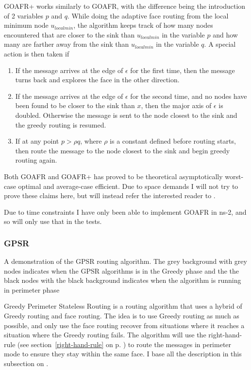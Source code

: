 GOAFR+ works similarly to GOAFR, with the difference being the introduction of 2 variables $p$ and $q$. While doing the adaptive face routing from the local minimum node $u_{local min}$, the algorithm keeps track of how many nodes encountered that are closer to the sink than $u_{local min}$ in the variable $p$ and how many are farther away from the sink than $u_{local min}$ in the variable $q$.
A special action is then taken if
\begin{enumerate}
\item If the message arrives at the edge of $\epsilon$ for the first time, then the message turns back and explores the face in the other direction. 
\item If the message arrives at the edge of $\epsilon$ for the second time, and no nodes have been found to be closer to the sink than $x$, then the major axis of $\epsilon$ is doubled. Otherwise the message is sent to the node closest to the sink and the greedy routing is resumed.
\item If at any point $p > \rho q$, where $\rho$ is a constant defined before routing starts, then route the message to the node closest to the sink and begin greedy routing again.
\end{enumerate}

Both GOAFR and GOAFR+ has proved to be theoretical asymptotically worst-case optimal and average-case efficient. Due to space demands I will not try to prove these claims here, but will instead refer the interested reader to \cite{gopher+, gopher}.

Due to time constraints I have only been able to implement GOAFR in ns-2, and so will only use that in the tests.

\subsubsection{GPSR}
{A demonstration of the GPSR routing algorithm. The grey background with grey nodes indicates when the GPSR algorithms is in the Greedy phase and the the black nodes with the black background indicates when the algorithm is running in perimeter phase}

\label{section:gpsr}
Greedy Perimeter Stateless Routing is a routing algorithm that uses a hybrid of Greedy routing and face routing. The idea is to use Greedy routing as much as possible, and only use the face routing recover from situations where it reaches a situation where the Greedy routing fails. The algorithm will use the right-hand-rule (see section~\ref{right-hand-rule} on p. \pageref{right-hand-rule}) to route the messages in perimeter mode to ensure they stay within the same face. I base all the description in this subsection on \cite{gpsr}.

